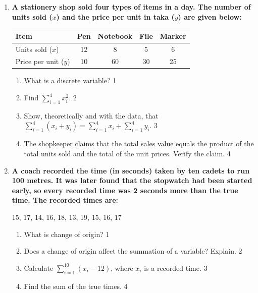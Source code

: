 \documentclass[a4paper,oneside]{book}
\begin{document}
\begin{enumerate}
\item
\textbf{A stationery shop sold four types of items in a day. The number of units sold ($x$) and the price per unit in taka ($y$) are given below:}
\begin{center}
\begin{tabular}{l|c|c|c|c}
Item & Pen & Notebook & File & Marker \\ \hline
Units sold ($x$) & 12 & 8 & 5 & 6 \\ \hline
Price per unit ($y$) & 10 & 60 & 30 & 25
\end{tabular}
\end{center}
\begin{enumerate}
  \item What is a discrete variable? \hfill 1
  \item Find $\displaystyle \sum_{i=1}^{4} x_i^2$. \hfill 2
  \item Show, theoretically and with the data, that $\displaystyle \sum_{i=1}^{4} (x_i+y_i) = \sum_{i=1}^{4}x_i + \sum_{i=1}^{4}y_i$. \hfill 3
  \item The shopkeeper claims that the total sales value equals the product of the total units sold and the total of the unit prices. Verify the claim. \hfill 4
\end{enumerate}

\item
\textbf{A coach recorded the time (in seconds) taken by ten cadets to run 100 metres. It was later found that the stopwatch had been started early, so every recorded time was 2 seconds more than the true time. The recorded times are:}
\begin{center}
15, 17, 14, 16, 18, 13, 19, 15, 16, 17
\end{center}
\begin{enumerate}
  \item What is change of origin? \hfill 1
  \item Does a change of origin affect the summation of a variable? Explain. \hfill 2
  \item Calculate $\displaystyle \sum_{i=1}^{10} (x_i-12)$, where $x_i$ is a recorded time. \hfill 3
  \item Find the sum of the true times. \hfill 4
\end{enumerate}

\end{enumerate}
\end{document}
